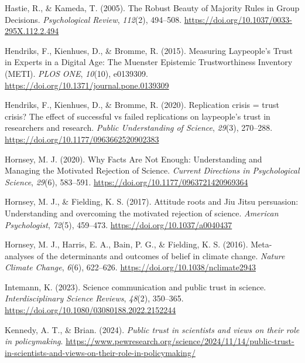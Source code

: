 \documentclass[
  jou,
  floatsintext,
  longtable,
  nolmodern,
  notxfonts,
  notimes,
  colorlinks=true,linkcolor=blue,citecolor=blue,urlcolor=blue]{apa7}
\newlength{\cslhangindent}
\newenvironment{CSLReferences}[2] %
 {\begin{list}{}{%
  \setlength{\itemindent}{0pt}
  \setlength{\leftmargin}{0pt}
  \setlength{\parsep}{0pt}
  \ifodd #1
   \setlength{\leftmargin}{\cslhangindent}
   \setlength{\itemindent}{-1\cslhangindent}
  \fi
  \setlength{\itemsep}{#2\baselineskip}}}
 {\end{list}}
\begin{document}
\begin{CSLReferences}{1}{0}
Hastie, R., \& Kameda, T. (2005). The Robust Beauty of Majority Rules in
Group Decisions. \emph{Psychological Review}, \emph{112}(2), 494--508.
\url{https://doi.org/10.1037/0033-295X.112.2.494}

Hendriks, F., Kienhues, D., \& Bromme, R. (2015). Measuring
Laypeople{'}s Trust in Experts in a Digital Age: The Muenster Epistemic
Trustworthiness Inventory (METI). \emph{PLOS ONE}, \emph{10}(10),
e0139309. \url{https://doi.org/10.1371/journal.pone.0139309}

Hendriks, F., Kienhues, D., \& Bromme, R. (2020). Replication crisis =
trust crisis? The effect of successful vs failed replications on
laypeople{'}s trust in researchers and research. \emph{Public
Understanding of Science}, \emph{29}(3), 270--288.
\url{https://doi.org/10.1177/0963662520902383}

Hornsey, M. J. (2020). Why Facts Are Not Enough: Understanding and
Managing the Motivated Rejection of Science. \emph{Current Directions in
Psychological Science}, \emph{29}(6), 583--591.
\url{https://doi.org/10.1177/0963721420969364}

Hornsey, M. J., \& Fielding, K. S. (2017). Attitude roots and Jiu Jitsu
persuasion: Understanding and overcoming the motivated rejection of
science. \emph{American Psychologist}, \emph{72}(5), 459--473.
\url{https://doi.org/10.1037/a0040437}

Hornsey, M. J., Harris, E. A., Bain, P. G., \& Fielding, K. S. (2016).
Meta-analyses of the determinants and outcomes of belief in climate
change. \emph{Nature Climate Change}, \emph{6}(6), 622--626.
\url{https://doi.org/10.1038/nclimate2943}

Intemann, K. (2023). Science communication and public trust in science.
\emph{Interdisciplinary Science Reviews}, \emph{48}(2), 350--365.
\url{https://doi.org/10.1080/03080188.2022.2152244}

Kennedy, A. T., \& Brian. (2024). \emph{Public trust in scientists and
views on their role in policymaking}.
\url{https://www.pewresearch.org/science/2024/11/14/public-trust-in-scientists-and-views-on-their-role-in-policymaking/}


\end{CSLReferences}
\end{document}
